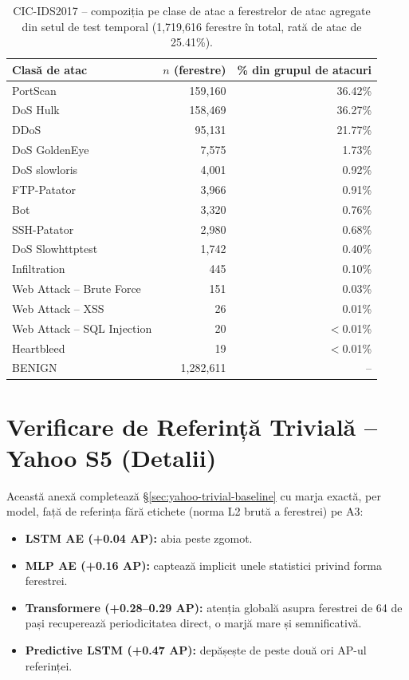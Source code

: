 \begin{table}[H]
\centering
\begin{tabular}{@{}lrr@{}}
\toprule
Clasă de atac & $n$ (ferestre) & \% din grupul de atacuri \\
\midrule
PortScan            & 159{,}160 & 36.42\% \\
DoS Hulk            & 158{,}469 & 36.27\% \\
DDoS                & 95{,}131  & 21.77\% \\
DoS GoldenEye       & 7{,}575   & 1.73\%  \\
DoS slowloris       & 4{,}001   & 0.92\%  \\
FTP-Patator         & 3{,}966   & 0.91\%  \\
Bot                 & 3{,}320   & 0.76\%  \\
SSH-Patator         & 2{,}980   & 0.68\%  \\
DoS Slowhttptest    & 1{,}742   & 0.40\%  \\
Infiltration        & 445       & 0.10\%  \\
Web Attack -- Brute Force & 151 & 0.03\%  \\
Web Attack -- XSS    & 26        & 0.01\%  \\
Web Attack -- SQL Injection & 20 & $<$0.01\% \\
Heartbleed          & 19        & $<$0.01\% \\
\midrule
BENIGN              & 1{,}282{,}611 & -- \\
\bottomrule
\end{tabular}
\caption{CIC-IDS2017 -- compoziția pe clase de atac a ferestrelor de atac agregate din setul de test temporal (1{,}719{,}616 ferestre în total, rată de atac de 25.41\%).}
\label{tab:cic-composition-temporal}
\end{table}



\chapter{Verificare de Referință Trivială -- Yahoo S5 (Detalii)}
\label{sec:yahoo-trivial-baseline-appendix}

Această anexă completează \S\ref{sec:yahoo-trivial-baseline} cu marja exactă, per model, față de referința fără etichete (norma L2 brută a ferestrei) pe A3:

\begin{itemize}
  \item \textbf{LSTM AE (+0.04 AP):} abia peste zgomot.
  \item \textbf{MLP AE (+0.16 AP):} captează implicit unele statistici privind forma ferestrei.
  \item \textbf{Transformere (+0.28--0.29 AP):} atenția globală asupra ferestrei de 64 de pași recuperează periodicitatea direct, o marjă mare și semnificativă.
  \item \textbf{Predictive LSTM (+0.47 AP):} depășește de peste două ori AP-ul referinței.
\end{itemize}

